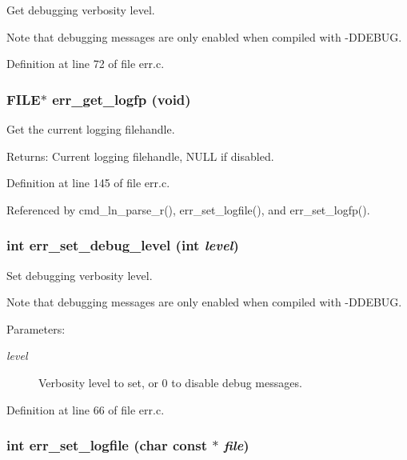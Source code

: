 Get debugging verbosity level. 

Note that debugging messages are only enabled when compiled with -DDEBUG. 

Definition at line 72 of file err.c.
\subsubsection[{err\_\-get\_\-logfp}]{\setlength{\rightskip}{0pt plus 5cm}FILE$\ast$ err\_\-get\_\-logfp (void)}\label{err_8c_e32e95118a1273e1e99584f2c555231a}


Get the current logging filehandle. 

\begin{Desc}
\item[Returns:]Current logging filehandle, NULL if disabled. \end{Desc}


Definition at line 145 of file err.c.

Referenced by cmd\_\-ln\_\-parse\_\-r(), err\_\-set\_\-logfile(), and err\_\-set\_\-logfp().
\subsubsection[{err\_\-set\_\-debug\_\-level}]{\setlength{\rightskip}{0pt plus 5cm}int err\_\-set\_\-debug\_\-level (int {\em level})}\label{err_8c_c7956e03cd685da5fe6e134c462f73e1}


Set debugging verbosity level. 

Note that debugging messages are only enabled when compiled with -DDEBUG.

\begin{Desc}
\item[Parameters:]
\begin{description}
\item[{\em level}]Verbosity level to set, or 0 to disable debug messages. \end{description}
\end{Desc}


Definition at line 66 of file err.c.
\subsubsection[{err\_\-set\_\-logfile}]{\setlength{\rightskip}{0pt plus 5cm}int err\_\-set\_\-logfile (char const $\ast$ {\em file})}\label{err_8c_aa2d9e5fcb8d7b80d941ba6374762ebe}


